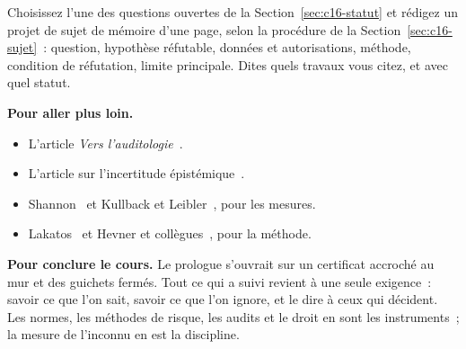 \begin{boxexo}[title={\ding{45}\quad Exercice~16.4. Un sujet de mémoire \niveauexpert}]
Choisissez l'une des questions ouvertes de la Section~\ref{sec:c16-statut}
et rédigez un projet de sujet de mémoire d'une page, selon la procédure de
la Section~\ref{sec:c16-sujet}~: question, hypothèse réfutable, données et
autorisations, méthode, condition de réfutation, limite principale. Dites
quels travaux vous citez, et avec quel statut.
\end{boxexo}

\bigskip

\begin{boxinfo}
\textbf{Pour aller plus loin.}
\begin{itemize}
    \item L'article \emph{Vers l'auditologie}~\cite{minka2026auditologie}.
    \item L'article sur l'incertitude épistémique~\cite{minka2026nek}.
    \item Shannon~\cite{shannon1948} et Kullback et
          Leibler~\cite{kullback1951}, pour les mesures.
    \item Lakatos~\cite{lakatos1970} et Hevner et
          collègues~\cite{hevner2004design}, pour la méthode.
\end{itemize}
\end{boxinfo}

\begin{boxinfo}
\textbf{Pour conclure le cours.} Le prologue s'ouvrait sur un certificat
accroché au mur et des guichets fermés. Tout ce qui a suivi revient à une
seule exigence~: savoir ce que l'on sait, savoir ce que l'on ignore, et le
dire à ceux qui décident. Les normes, les méthodes de risque, les audits et
le droit en sont les instruments~; la mesure de l'inconnu en est la
discipline.
\end{boxinfo}
